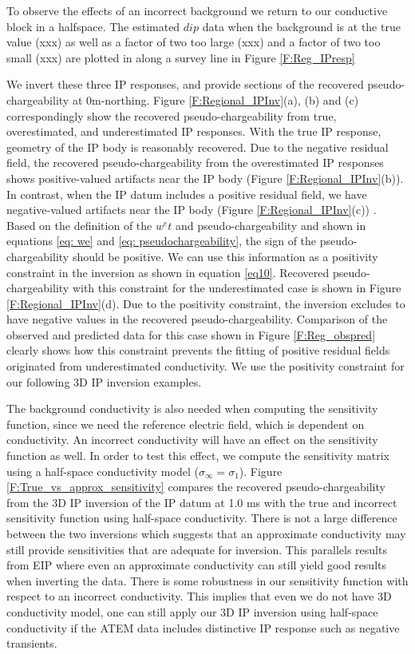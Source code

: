 \documentclass[a4paper, 11pt]{article}
\newcommand{\siginf}{\sigma_\infty}
\begin{document}
To observe the effects of an incorrect background we return to our conductive block in a halfspace. The estimated $dip$ data when the background is at the true value (xxx) as well as a factor of two too large (xxx) and a factor of two too small (xxx) are plotted in  along a survey line in Figure \ref{F:Reg_IPresp} 

We invert these three IP responses, and provide sections of the recovered pseudo-chargeability at 0m-northing. 
Figure \ref{F:Regional_IPInv}(a), (b) and (c) correspondingly show the recovered pseudo-chargeability from true, overestimated, and underestimated IP responses. 
With the true IP response, geometry of the IP body is reasonably recovered. 
Due to the negative residual field, the recovered pseudo-chargeability from the overestimated IP responses shows positive-valued artifacts near the IP body (Figure \ref{F:Regional_IPInv}(b)). 
In contrast, when the IP datum includes a positive residual field, we have negative-valued artifacts near the IP body (Figure \ref{F:Regional_IPInv}(c)) . 
Based on the definition of the  $w^e{t}$ and pseudo-chargeability and shown in equations \ref{eq: we} and \ref{eq: pseudochargeability}, the sign of the pseudo-chargeability should be positive. 
We can use this information as a positivity constraint in the inversion as shown in equation \ref{eq10}. 
Recovered pseudo-chargeability with this constraint for the underestimated case is shown in Figure \ref{F:Regional_IPInv}(d). 
Due to the positivity constraint, the inversion excludes to have negative values in the recovered pseudo-chargeability. 
Comparison of the observed and predicted data for this case shown in Figure \ref{F:Reg_obspred} clearly shows how this constraint prevents the fitting of positive residual fields originated from underestimated conductivity. We use the positivity  constraint for our following 3D IP inversion examples. 

The background conductivity is also needed when computing the sensitivity function, since we need the reference electric field, which is dependent on conductivity. 
An incorrect conductivity will have an effect on the sensitivity function as well. 
In order to test this effect, we compute the sensitivity  matrix using a half-space conductivity model ($\siginf = \sigma_1$). 
Figure \ref{F:True_vs_approx_sensitivity} compares the recovered pseudo-chargeability from the 3D IP inversion of the IP datum at 1.0 ms with the true and incorrect sensitivity function using half-space conductivity. 
There is not a large difference between the two inversions  which suggests that an approximate conductivity may still provide sensitivities that are adequate for inversion. This parallels results from EIP where even an approximate conductivity can still yield good results when inverting the data. There is some robustness in our sensitivity function with respect to an  incorrect conductivity. 
This implies that even we do not have 3D conductivity model, one can still apply our 3D IP inversion using half-space conductivity if the ATEM data includes distinctive IP response such as negative transients. 
\end{document}
